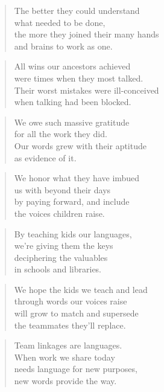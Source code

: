 \documentclass[10pt,a4paper]{article}
\begin{document}
\begin{multicols}{2}
\begin{verse}
The better they could understand\\
what needed to be done,\\
the more they joined their many hands\\
and brains to work as one.
\end{verse}

\begin{verse}
All wins our ancestors achieved\\
were times when they most talked.\\
Their worst mistakes were ill-conceived\\
when talking had been blocked.
\end{verse}

\begin{verse}
We owe such massive gratitude\\
for all the work they did.\\
Our words grew with their aptitude\\
as evidence of it.
\end{verse}

\begin{verse}
We honor what they have imbued\\
us with beyond their days\\
by paying forward, and include\\
the voices children raise.
\end{verse}

\begin{verse}
By teaching kids our languages,\\
we’re giving them the keys\\
deciphering the valuables\\
in schools and libraries.
\end{verse}

\begin{verse}
We hope the kids we teach and lead\\
through words our voices raise\\
will grow to match and supersede\\
the teammates they’ll replace.
\end{verse}

\begin{verse}
Team linkages are languages.\\
When work we share today\\
needs language for new purposes,\\
new words provide the way.
\end{verse}


\end{multicols}
\end{document}
